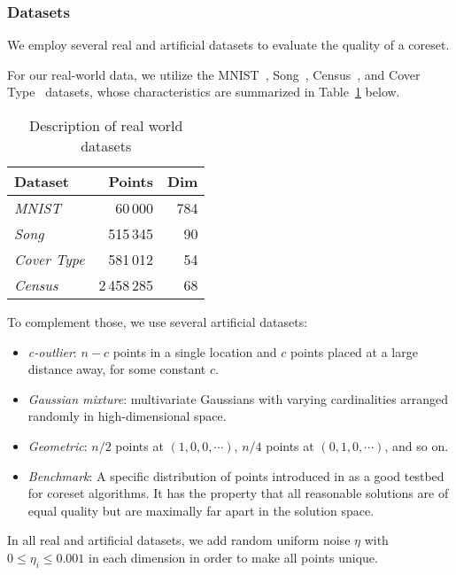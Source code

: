 \subsubsection{Datasets}


We employ several real and artificial datasets to evaluate the quality of a coreset. 

For our real-world data, we utilize the MNIST~\cite{mnist}, Song~\cite{song}, Census~\cite{census}, and Cover Type~\cite{covtype} datasets, whose characteristics are summarized in 
Table~\cref{tbl:datasets} below.
\begin{table}[htbp]
    \label{tbl:datasets}
    \centering
    \begin{tabular}{lrr}
        Dataset & Points & Dim \\
        \hline
        \emph{MNIST} & 60\,000 & 784 \\
        \emph{Song} & 515\,345 & 90 \\
        \emph{Cover Type} & 581\,012 & 54 \\
        \emph{Census} & 2\,458\,285 & 68
    \end{tabular}
    \caption{Description of real world datasets}
\end{table}

To complement those, we use several artificial datasets:
\begin{itemize}
    \item \emph{c-outlier}: $n-c$ points in a single location and $c$ points placed at a large distance away, for some constant $c$.
    \item \emph{Gaussian mixture}: multivariate Gaussians with varying cardinalities arranged randomly in high-dimensional space. 
    \item \emph{Geometric}: $n/2$ points at $(1, 0, 0, \cdots)$, $n/4$ points at $(0, 1, 0, \cdots)$, and so on. 
    \item \emph{Benchmark}: A specific distribution of points introduced in \cite{chrisESA} as a good testbed for coreset algorithms. 
    It has the property that all reasonable solutions are of equal quality but are maximally far
            apart in the solution space.
\end{itemize}

In all real and artificial datasets, we add random uniform noise $\eta$ with $0 \leq \eta_i \leq 0.001$ in each dimension in order to make all points unique.

